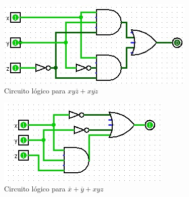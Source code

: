 \begin{figure}[h!]
    \centering
    \includegraphics[width=\textwidth]{recursos/Ejercicio2/circuito_c.png}
    \caption{Circuito lógico para $xy\overline{z} + x\overline{yz}$}
\end{figure}

\begin{figure}[h!]
    \centering
    \includegraphics[width=\textwidth]{recursos/Ejercicio2/circuito_d.png}
    \caption{Circuito lógico para $\overline{x} + \overline{y} + xyz$}
\end{figure}



